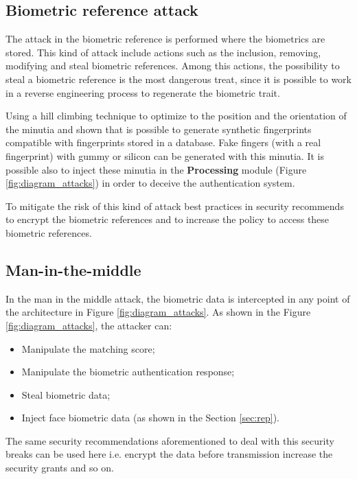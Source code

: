 \subsection{Biometric reference attack}

The attack in the biometric reference is performed where the biometrics are stored. This kind of attack include actions such as the inclusion, removing, modifying and steal biometric references. Among this actions, the possibility to steal a biometric reference is the most dangerous treat, since it is possible to work in a reverse engineering process to regenerate the biometric trait. 

Using a hill climbing technique to optimize to the position and the orientation of the minutia \cite{MartinezDiaz2006} and \cite{hill2001risk} shown that is possible to generate synthetic fingerprints compatible with fingerprints stored in a database. Fake fingers (with a real fingerprint) with gummy or silicon can be generated with this minutia. It is possible also to inject these minutia in the \textbf{Processing} module (Figure \ref{fig:diagram_attacks}) in order to deceive the authentication system. 

To mitigate the risk of this kind of attack best practices in security recommends to encrypt the biometric references and to increase the policy to access these biometric references. 

\subsection{Man-in-the-middle}

In the man in the middle attack, the biometric data is intercepted in any point of the architecture in Figure \ref{fig:diagram_attacks}.  As shown in the Figure \ref{fig:diagram_attacks}, the attacker can:
\begin{itemize}
        \item Manipulate the matching score;
        \item Manipulate the biometric authentication response;
        \item Steal biometric data;
        \item Inject face biometric data (as shown in the Section \ref{sec:rep}).
\end{itemize}

The same security recommendations aforementioned to deal with this security breaks can be used here i.e. encrypt the data before transmission increase the security grants and so on. 


